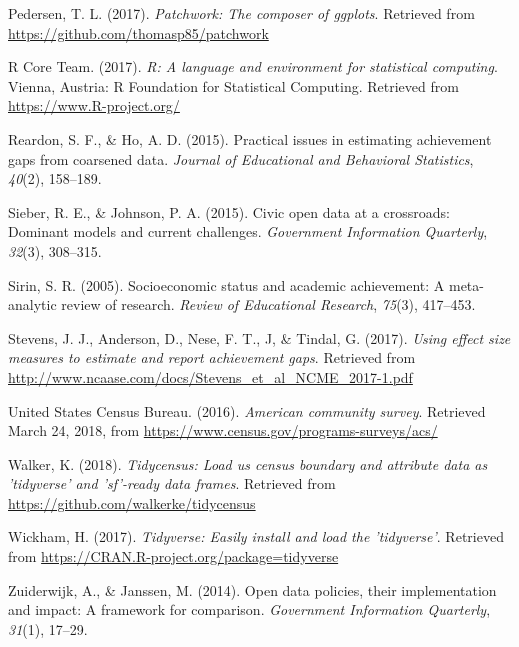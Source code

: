 \documentclass[man, fleqn, noextraspace]{apa6}
\theoremstyle{definition}
\theoremstyle{definition}
\theoremstyle{definition}
\theoremstyle{remark}
\begin{document}
\leavevmode\hypertarget{ref-patchwork}{}%
Pedersen, T. L. (2017). \emph{Patchwork: The composer of ggplots}.
Retrieved from \url{https://github.com/thomasp85/patchwork}

\leavevmode\hypertarget{ref-r}{}%
R Core Team. (2017). \emph{R: A language and environment for statistical
computing}. Vienna, Austria: R Foundation for Statistical Computing.
Retrieved from \url{https://www.R-project.org/}

\leavevmode\hypertarget{ref-reardon15}{}%
Reardon, S. F., \& Ho, A. D. (2015). Practical issues in estimating
achievement gaps from coarsened data. \emph{Journal of Educational and
Behavioral Statistics}, \emph{40}(2), 158--189.

\leavevmode\hypertarget{ref-sieber15}{}%
Sieber, R. E., \& Johnson, P. A. (2015). Civic open data at a
crossroads: Dominant models and current challenges. \emph{Government
Information Quarterly}, \emph{32}(3), 308--315.

\leavevmode\hypertarget{ref-sirin05}{}%
Sirin, S. R. (2005). Socioeconomic status and academic achievement: A
meta-analytic review of research. \emph{Review of Educational Research},
\emph{75}(3), 417--453.

\leavevmode\hypertarget{ref-stevens17}{}%
Stevens, J. J., Anderson, D., Nese, F. T., J, \& Tindal, G. (2017).
\emph{Using effect size measures to estimate and report achievement
gaps}. Retrieved from
\url{http://www.ncaase.com/docs/Stevens_et_al_NCME_2017-1.pdf}

\leavevmode\hypertarget{ref-acs}{}%
United States Census Bureau. (2016). \emph{American community survey}.
Retrieved March 24, 2018, from
\url{https://www.census.gov/programs-surveys/acs/}

\leavevmode\hypertarget{ref-tidycensus}{}%
Walker, K. (2018). \emph{Tidycensus: Load us census boundary and
attribute data as 'tidyverse' and 'sf'-ready data frames}. Retrieved
from \url{https://github.com/walkerke/tidycensus}

\leavevmode\hypertarget{ref-tidyverse}{}%
Wickham, H. (2017). \emph{Tidyverse: Easily install and load the
'tidyverse'}. Retrieved from
\url{https://CRAN.R-project.org/package=tidyverse}

\leavevmode\hypertarget{ref-zuiderwijk14}{}%
Zuiderwijk, A., \& Janssen, M. (2014). Open data policies, their
implementation and impact: A framework for comparison. \emph{Government
Information Quarterly}, \emph{31}(1), 17--29.

\endgroup
\end{document}

